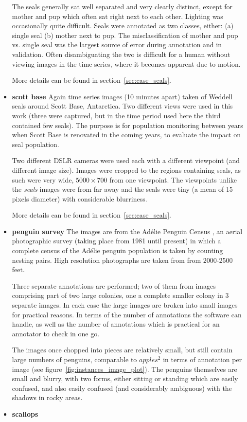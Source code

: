\begin{itemize}
The seals generally sat well separated and very clearly distinct, except for mother and pup which often sat right next to each other. Lighting was occasionally quite difficult. Seals were annotated as two classes, either: (a) single seal (b) mother next to pup.  The misclassification of mother and pup vs. single seal was the largest source of error during annotation and in validation. Often disambiguating the two is difficult for a human without viewing images in the time series, where it becomes apparent due to motion.

More details can be found in section~\ref{sec:case_seals}.

    \item{\bf{scott base}}
Again time series images (10 minutes apart) taken of Weddell seals around Scott Base, Antarctica. Two different views were used in this work (three were captured, but in the time period used here the third contained few seals). The purpose is for population monitoring between years when Scott Base is renovated in the coming years, to evaluate the impact on seal population.

Two different DSLR cameras were used each with a different viewpoint (and different image size). Images were cropped to the regions containing seals, as such were very wide, $5000\times700$ from one viewpoint. The viewpoints unlike the \emph{seals} images were from far away and the seals were tiny (a mean of $15$ pixels diameter) with considerable blurriness.  
    
More details can be found in section~\ref{sec:case_seals}.
    
    \item{\bf{penguin survey}}
The images are from the Adélie Penguin Census \cite{Lyver2014}, an aerial photographic survey (taking place from 1981 until present) in which a complete census of the Adélie penguin population is taken by counting nesting pairs. High resolution photographs are taken from from 2000-2500 feet.

Three separate annotations are performed; two of them from images comprising part of two large colonies, one a complete smaller colony in 3 separate images. In each case the large images are broken into small images for practical reasons. In terms of the number of annotations the software can handle, as well as the number of annotations which is practical for an annotator to check in one go.
    
The images once chopped into pieces are relatively small, but still contain large numbers of penguins, comparable to $apples^2$ in terms of annotation per image (see figure~\ref{fig:instances_image_plot}). The penguins themselves are small and blurry, with two forms, either sitting or standing which are easily confused, and also easily confused (and considerably ambiguous) with the shadows in rocky areas.  
    \item{\bf{scallops}}
    

\end{itemize}
